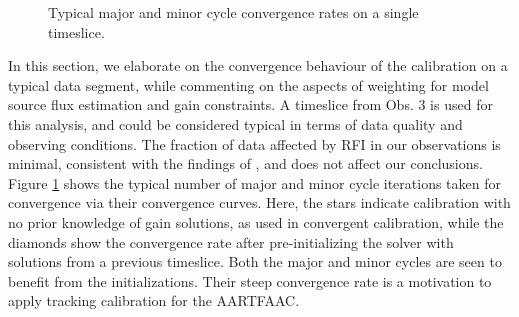 \documentclass{aa}
\begin{document}
\begin{figure}[tbh]

\caption{\label{fig:Convergence-behaviour-of}Typical   major  and   minor  cycle
  convergence rates on  a single timeslice.}
\end{figure}

In this section, we elaborate on the convergence behaviour of the calibration on
a typical data  segment, while commenting on the aspects  of weighting for model
source flux estimation  and gain constraints.  A timeslice from  Obs.  3 is used
for this analysis, and could be  considered typical in terms of data quality and
observing conditions.  The fraction of  data affected by RFI in our observations
is minimal, consistent with  the findings of \citep{offringa2013lofar}, and does
not affect our conclusions.  Figure \ref{fig:Convergence-behaviour-of} shows the
typical number  of major  and minor cycle  iterations taken for  convergence via
their convergence  curves. Here,  the stars indicate  calibration with  no prior
knowledge  of gain  solutions,  as  used in  convergent  calibration, while  the
diamonds  show  the convergence  rate  after  pre-initializing  the solver  with
solutions from a  previous timeslice.  Both the major and  minor cycles are seen
to  benefit  from  the  initializations.  Their  steep  convergence  rate  is  a
motivation to apply tracking calibration for the AARTFAAC.
\end{document}
